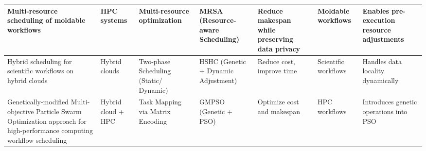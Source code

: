 \documentclass[a4paper, final]{article}
\begin{document}
\begin{table}[H]
\begin{tabularx}{\textwidth}{|p{3.5cm}|X|X|p{2cm}|X|X|X|}
    Multi-resource scheduling of moldable workflows \cite{bib:8} &
    HPC systems &
    Multi-resource optimization &
    MRSA (Resource-aware Scheduling) &
    Reduce makespan while preserving data privacy &
    Moldable workflows &
    Enables pre-execution resource adjustments \\
    \hline

    
    Hybrid scheduling for scientific workflows on hybrid clouds \cite{bib:9} &
    Hybrid clouds &
    Two-phase Scheduling (Static/ Dynamic) &
    HSHC (Genetic + Dynamic Adjustment) &
    Reduce cost, improve time &
    Scientific workflows &
    Handles data locality dynamically \\
    \hline

    Genetically-modified Multi-objective Particle Swarm Optimization approach for 
    high-performance computing workflow scheduling \cite{bib:10} &
    Hybrid cloud + HPC &
    Task Mapping via Matrix Encoding &
    GMPSO (Genetic + PSO) &
    Optimize cost and makespan &
    HPC workflows &
    Introduces genetic operations into PSO \\
    \hline
    \end{tabularx}
\end{table}

\newpage
\cleardoublepage
{}
\appendix
\end{document}
